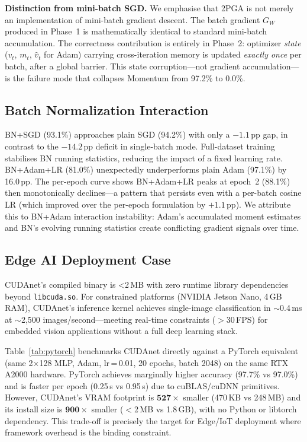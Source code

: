 \documentclass[conference]{IEEEtran}
\begin{document}
\textbf{Distinction from mini-batch SGD.} We emphasise that 2PGA is not merely an implementation of mini-batch gradient descent. The batch gradient $G_W$ produced in Phase~1 is mathematically identical to standard mini-batch accumulation. The correctness contribution is entirely in Phase~2: optimizer \emph{state} ($v_t$, $m_t$, $\hat{v}_t$ for Adam) carrying cross-iteration memory is updated \emph{exactly once} per batch, after a global barrier. This state corruption—not gradient accumulation—is the failure mode that collapses Momentum from 97.2\% to 0.0\%.

\subsection{Batch Normalization Interaction}

BN+SGD (93.1\%) approaches plain SGD (94.2\%) with only a $-1.1$\,pp gap, in contrast to the $-14.2$\,pp deficit in single-batch mode. Full-dataset training stabilises BN running statistics, reducing the impact of a fixed learning rate. BN+Adam+LR (81.0\%) unexpectedly underperforms plain Adam (97.1\%) by 16.0\,pp. The per-epoch curve shows BN+Adam+LR peaks at epoch~2 (88.1\%) then monotonically declines—a pattern that persists even with a per-batch cosine LR (which improved over the per-epoch formulation by $+1.1$\,pp). We attribute this to BN+Adam interaction instability: Adam's accumulated moment estimates and BN's evolving running statistics create conflicting gradient signals over time.

\subsection{Edge AI Deployment Case}

CUDAnet's compiled binary is \textless 2\,MB with zero runtime library dependencies beyond \texttt{libcuda.so}. For constrained platforms (NVIDIA Jetson Nano, 4\,GB RAM), CUDAnet's inference kernel achieves single-image classification in $\sim$0.4\,ms at $\sim$2,500 images/second—meeting real-time constraints ($>$30\,FPS) for embedded vision applications without a full deep learning stack.

Table~\ref{tab:pytorch} benchmarks CUDAnet directly against a PyTorch equivalent (same 2$\times$128 MLP, Adam, lr\,=\,0.01, 20 epochs, batch 2048) on the same RTX A2000 hardware. PyTorch achieves marginally higher accuracy (97.7\% vs 97.0\%) and is faster per epoch (0.25\,s vs 0.95\,s) due to cuBLAS/cuDNN primitives. However, CUDAnet's VRAM footprint is $\mathbf{527\times}$ smaller (470\,KB vs 248\,MB) and its install size is $\mathbf{900\times}$ smaller ($<$2\,MB vs 1.8\,GB), with no Python or libtorch dependency. This trade-off is precisely the target for Edge/IoT deployment where framework overhead is the binding constraint.
\end{document}
